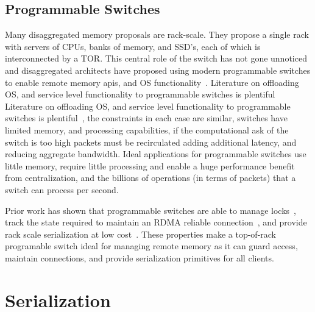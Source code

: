 

\subsection{Programmable Switches}

Many disaggregated memory proposals are rack-scale. They
propose a single rack with servers of CPUs, banks of memory,
and SSD's, each of which is interconnected by a TOR. This
central role of the switch has not gone unnoticed and
disaggregated architects have proposed using modern
programmable switches to enable remote memory apis, and OS
functionality~\cite{disandapp,mind}. Literature on
offloading OS, and service level functionality to
programmable switches is plentiful Literature on offloading
OS, and service level functionality to programmable switches
is plentiful~\cite{netlock,netkv,netchain,netcache}, the
constraints in each case are similar, switches have limited
memory, and processing capabilities, if the computational
ask of the switch is too high packets must be recirculated
adding additional latency, and reducing aggregate bandwidth.
Ideal applications for programmable switches use little
memory, require little processing and enable a huge
performance benefit from centralization, and the billions of
operations (in terms of packets) that a switch can process
per second.

Prior work has shown that programmable switches are able to
manage locks~\cite{netlock}, track the state required to
maintain an RDMA reliable connection~\cite{tea}, and provide
rack scale serialization at low
cost~\cite{eris,no,when-computer}. These properties make a
top-of-rack programable switch ideal for managing remote
memory as it can guard access, maintain connections, and
provide serialization primitives for all clients.


\section{Serialization}

